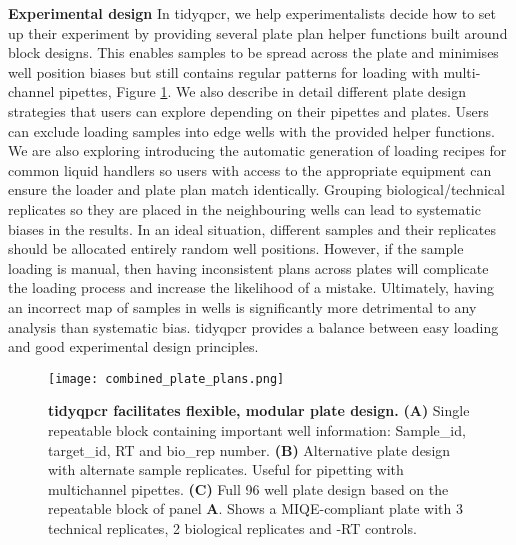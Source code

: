 \documentclass[../main.tex]{subfiles}
\begin{document}
\textbf{Experimental design}  In tidyqpcr, we help experimentalists decide how to set up their experiment by providing several plate plan helper functions built around block designs.
This enables samples to be spread across the plate and minimises well position biases but still contains regular patterns for loading with multi-channel pipettes, Figure \ref{fig:combined-plate-design}.
We also describe in detail different plate design strategies that users can explore depending on their pipettes and plates.
Users can exclude loading samples into edge wells with the provided helper functions.
We are also exploring introducing the automatic generation of loading recipes for common liquid handlers so users with access to the appropriate equipment can ensure the loader and plate plan match identically.
Grouping biological/technical replicates so they are placed in the neighbouring wells can lead to systematic biases in the results.
In an ideal situation, different samples and their replicates should be allocated entirely random well positions.
However, if the sample loading is manual, then having inconsistent plans across plates will complicate the loading process and increase the likelihood of a mistake.
Ultimately, having an incorrect map of samples in wells is significantly more detrimental to any analysis than systematic bias.
tidyqpcr provides a balance between easy loading and good experimental design principles.

\begin{figure}[p]

{\centering \texttt{[image: combined\_plate\_plans.png]} 

}

\caption[tidyqpcr facilitates flexible, modular plate design.]{\textbf{tidyqpcr facilitates flexible, modular plate design.} \textbf{(A)} Single repeatable block containing important well information: Sample\_id, target\_id, RT and bio\_rep number. 
\textbf{(B)} Alternative plate design with alternate sample replicates. Useful for pipetting with multichannel pipettes. 
\textbf{(C)} Full 96 well plate design based on the repeatable block of panel \textbf{A}. 
Shows a MIQE-compliant plate with 3 technical replicates, 2 biological replicates and -RT controls.} \label{fig:combined-plate-design}
\end{figure}
\end{document}
